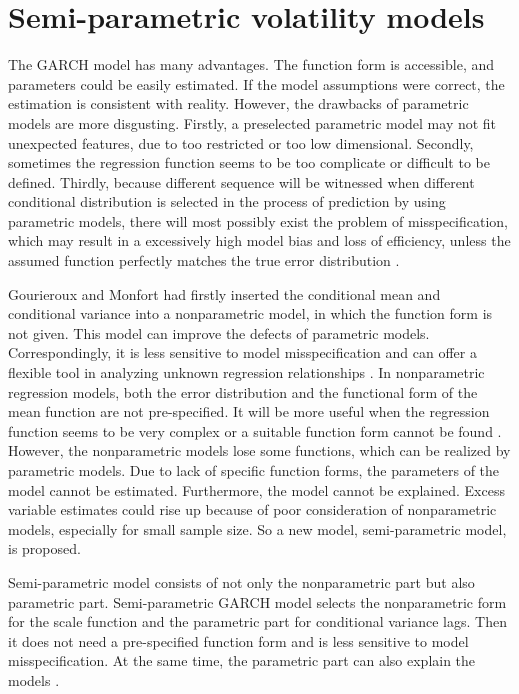 \chapter{Semi-parametric volatility models}\label{semiparaGarch}

The GARCH model has many advantages. The function form is accessible, and parameters could be easily estimated. If the model assumptions were correct, the estimation is consistent with reality. However, the drawbacks of parametric models are more disgusting. Firstly, a preselected parametric model may not fit unexpected features, due to too restricted or too low dimensional. Secondly, sometimes the regression function seems to be too complicate or difficult to be defined. Thirdly, because different sequence will be witnessed when different conditional distribution is selected in the process of prediction by using parametric models, there will most possibly exist the problem of misspecification, which may result in a excessively high model bias and loss of efficiency, unless the assumed function perfectly matches the true error distribution \citep{Di2011}.

Gourieroux and Monfort had firstly inserted the conditional mean and conditional variance into a nonparametric model, in which the function form is not given.  This model can improve the defects of parametric models. Correspondingly, it is less sensitive to model misspecification and can offer a flexible tool in analyzing unknown regression relationships 
\citep{Gourieroux1992}. In nonparametric regression models, both the error distribution and the functional form of the mean function are not pre-specified. It will be more useful when the regression function seems to be very complex or a suitable function form cannot be found \citep{Eubank1993}. However, the nonparametric models lose some functions, which can be realized by parametric models. Due to lack of specific function forms, the parameters of the model cannot be estimated. Furthermore, the model cannot be explained. Excess variable estimates could rise up because of poor consideration of nonparametric models, especially for small sample size. So a new model, semi-parametric model, is proposed.

Semi-parametric model consists of not only the nonparametric part but also parametric part. Semi-parametric GARCH model selects the nonparametric form for the scale function and the parametric part for conditional variance lags. Then it does not need a pre-specified function form and is less sensitive to model misspecification. At the same time, the parametric part can also explain the models \citep{Di2011}.


